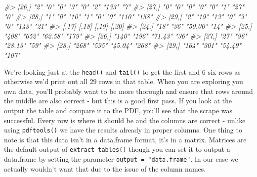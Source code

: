 \documentclass[
]{krantz}
\makeatletter
\newenvironment{Shaded}{\begin{snugshade}}{\end{snugshade}}
\newcommand{\CommentTok}[1]{\textcolor[rgb]{0.37,0.37,0.37}{\textit{#1}}}
\newenvironment{kframe}{%
\medskip{}
\setlength{\fboxsep}{.8em}
 \def\at@end@of@kframe{}%
 \ifinner\ifhmode%
  \def\at@end@of@kframe{\end{minipage}}%
  \begin{minipage}{\columnwidth}%
 \fi\fi%
 \def\FrameCommand##1{\hskip\@totalleftmargin \hskip-\fboxsep
 \colorbox{shadecolor}{##1}\hskip-\fboxsep
     \hskip-\linewidth \hskip-\@totalleftmargin \hskip\columnwidth}%
 \MakeFramed {\advance\hsize-\width
   \@totalleftmargin\z@ \linewidth\hsize
   \@setminipage}}%
 {\par\unskip\endMakeFramed%
 \at@end@of@kframe}
\renewenvironment{Shaded}{\begin{kframe}}{\end{kframe}}
\makeatother
\begin{document}
\begin{Shaded}
\begin{Highlighting}[]
\CommentTok{\#\textgreater{} [26,] "2"  "0"   "0"   "3"   "0"   "2"   "133" "7"  }
\CommentTok{\#\textgreater{} [27,] "0"  "0"   "0"   "0"   "0"   "1"   "27"  "0"  }
\CommentTok{\#\textgreater{} [28,] "1"  "0"   "10"  "1"   "0"   "0"   "110" "158"}
\CommentTok{\#\textgreater{} [29,] "2"  "19"  "13"  "0"   "3"   "0"   "143" "21" }
\CommentTok{\#\textgreater{}       [,17] [,18] [,19]   [,20]}
\CommentTok{\#\textgreater{} [24,] "18"  "36"  "50.00" "14" }
\CommentTok{\#\textgreater{} [25,] "408" "652" "62.58" "179"}
\CommentTok{\#\textgreater{} [26,] "140" "196" "71.43" "36" }
\CommentTok{\#\textgreater{} [27,] "27"  "96"  "28.13" "59" }
\CommentTok{\#\textgreater{} [28,] "268" "595" "45.04" "268"}
\CommentTok{\#\textgreater{} [29,] "164" "301" "54.49" "107"}
\end{Highlighting}
\end{Shaded}

We're looking just at the \texttt{head()} and \texttt{tail()} to get the first and 6 six rows as otherwise we'd print out all 29 rows in that table. When you are exploring you own data, you'll probably want to be more thorough and ensure that rows around the middle are also correct - but this is a good first pass. If you look at the output the table and compare it to the PDF, you'll see that the scrape was successful. Every row is where it should be and the columns are correct - unlike using \texttt{pdftools()} we have the results already in proper columns. One thing to note is that this data isn't in a data.frame format, it's in a matrix. Matrices are the default output of \texttt{extract\_tables()} though you can set it to output a data.frame by setting the parameter \texttt{output\ =\ "data.frame"}. In our case we actually wouldn't want that due to the issue of the column names.
\end{document}
